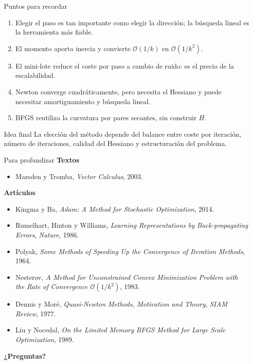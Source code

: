 \documentclass[10pt,aspectratio=169]{beamer}
\begin{document}
\begin{frame}{Puntos para recordar}
  \small
  \begin{enumerate}
    \item Elegir el paso es tan importante como elegir la dirección;
      la búsqueda lineal es la herramienta más fiable.
    \item El momento aporta inercia y convierte $\mathcal{O}(1/k)$ en
      $\mathcal{O}(1/k^{2})$.
    \item El mini-lote reduce el coste por paso a cambio de ruido:
      es el precio de la escalabilidad.
    \item Newton converge cuadráticamente, pero necesita el Hessiano y
      puede necesitar amortiguamiento y búsqueda lineal.
    \item BFGS reutiliza la curvatura por pares secantes, sin construir $H$.
  \end{enumerate}
  \vfill
  \begin{alertblock}{Idea final}
    La elección del método depende del balance entre coste por iteración,
    número de iteraciones, calidad del Hessiano y estructuración del problema.
  \end{alertblock}
\end{frame}

\begin{frame}{Para profundizar}
  \small
  \textbf{Textos}
  \begin{itemize}
    \item Marsden y Tromba, \emph{Vector Calculus}, 2003.
  \end{itemize}
  \textbf{Artículos}
  \begin{itemize}
    \item Kingma y Ba, \emph{Adam: A Method for Stochastic Optimization}, 2014.
    \item Rumelhart, Hinton y Williams, \emph{Learning Representations by
      Back-propagating Errors}, \emph{Nature}, 1986.
    \item Polyak, \emph{Some Methods of Speeding Up the Convergence of Iteration
      Methods}, 1964.
    \item Nesterov, \emph{A Method for Unconstrained Convex Minimization
      Problem with the Rate of Convergence $\mathcal{O}(1/k^{2})$}, 1983.
    \item Dennis y Moré, \emph{Quasi-Newton Methods, Motivation and Theory},
      \emph{SIAM Review}, 1977.
    \item Liu y Nocedal, \emph{On the Limited Memory BFGS Method for Large
      Scale Optimization}, 1989.
  \end{itemize}
  \vfill
  \begin{center}
    \large\textbf{¿Preguntas?}
  \end{center}
\end{frame}
\end{document}
